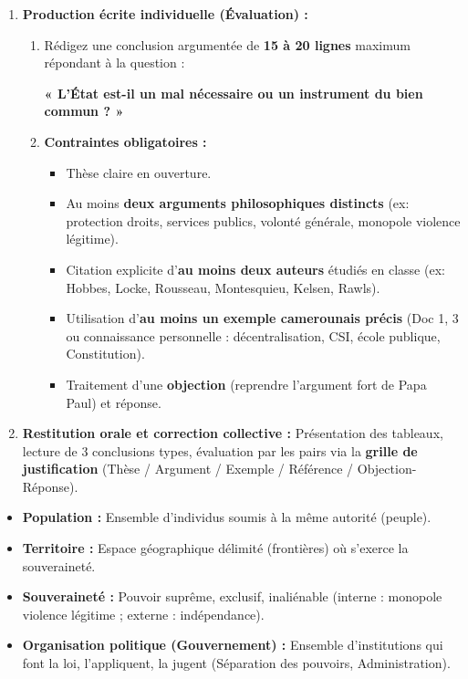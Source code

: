 \documentclass[11pt]{article}
\newcounter{popsec}
\newcounter{popsub}
\newcommand{\courssub}[1]{%
  \stepcounter{popsub}%
  \par\vspace{9pt}\noindent{\popxbold\fontsize{11.5}{13}\selectfont\color{popink}{\color{poporange}\thepopsec.\thepopsub}\hspace{6pt}#1}\par\nopagebreak\vspace{4pt}
}
\begin{document}
\begin{enumerate}
\begin{enumerate}
    \end{enumerate}
    \item \textbf{Production écrite individuelle (Évaluation) :} 
    \begin{enumerate}
        \item Rédigez une conclusion argumentée de \textbf{15 à 20 lignes} maximum répondant à la question : 
        \begin{center}
        \textbf{« L'État est-il un mal nécessaire ou un instrument du bien commun ? »}
        \end{center}
        \item \textbf{Contraintes obligatoires :} 
        \begin{itemize}
            \item Thèse claire en ouverture.
            \item Au moins \textbf{deux arguments philosophiques distincts} (ex: protection droits, services publics, volonté générale, monopole violence légitime).
            \item Citation explicite d'\textbf{au moins deux auteurs} étudiés en classe (ex: Hobbes, Locke, Rousseau, Montesquieu, Kelsen, Rawls).
            \item Utilisation d'\textbf{au moins un exemple camerounais précis} (Doc 1, 3 ou connaissance personnelle : décentralisation, CSI, école publique, Constitution).
            \item Traitement d'une \textbf{objection} (reprendre l'argument fort de Papa Paul) et réponse.
        \end{itemize}
    \end{enumerate}
    \item \textbf{Restitution orale et correction collective :} Présentation des tableaux, lecture de 3 conclusions types, évaluation par les pairs via la \textbf{grille de justification} (Thèse / Argument / Exemple / Référence / Objection-Réponse).
\end{enumerate}

\courssub{Ressources à mobiliser}
\begin{definition}
\begin{itemize}
    \item \textbf{Population :} Ensemble d'individus soumis à la même autorité (peuple).
    \item \textbf{Territoire :} Espace géographique délimité (frontières) où s'exerce la souveraineté.
    \item \textbf{Souveraineté :} Pouvoir suprême, exclusif, inaliénable (interne : monopole violence légitime ; externe : indépendance).
    \item \textbf{Organisation politique (Gouvernement) :} Ensemble d'institutions qui font la loi, l'appliquent, la jugent (Séparation des pouvoirs, Administration).
\end{itemize}
\end{definition}
\end{document}
